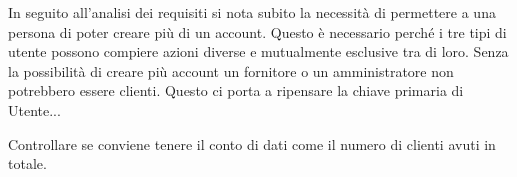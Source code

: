 In seguito all'analisi dei requisiti si nota subito la necessità di permettere a una persona di poter creare più di un account. Questo è necessario perché i tre tipi di utente possono compiere azioni diverse e mutualmente esclusive tra di loro. Senza la possibilità di creare più account un fornitore o un amministratore non potrebbero essere clienti. Questo ci porta a ripensare la chiave primaria di Utente...%


Controllare se conviene tenere il conto di dati come il numero di clienti avuti in totale. %